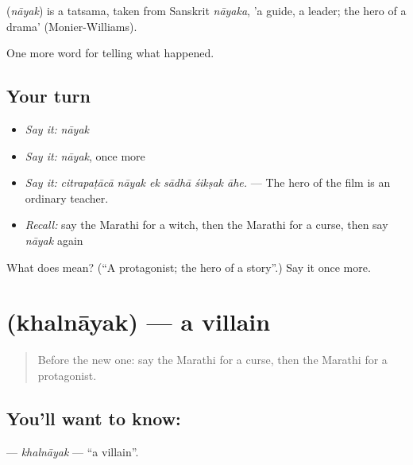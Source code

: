 \begin{cousinweb}
\textbf{} (\emph{nāyak}) is a tatsama, taken from Sanskrit \emph{nāyaka}, 'a guide, a leader; the hero of a drama' (Monier-Williams).
\end{cousinweb}

\begin{grammarlens}[title={What you've built}]
One more word for telling what happened.
\end{grammarlens}

\subsection*{Your turn}
\begin{itemize}
\raggedright
  \item \emph{Say it:} \emph{nāyak}
  \item \emph{Say it:} \emph{nāyak}, once more
  \item \emph{Say it:} \emph{citrapaṭācā nāyak ek sādhā śikṣak āhe.} — The hero of the film is an ordinary teacher.
  \item \emph{Recall:} say the Marathi for a witch, then the Marathi for a curse, then say \emph{nāyak} again
\end{itemize}

\begin{tcolorbox}[breakable,colback=teal!4,colframe=teal!35!black,title={Before you move on}]
What does  mean? (\textquotedblleft{}A protagonist; the hero of a story\textquotedblright{}.) Say it once more.
\end{tcolorbox}
\section[\texorpdfstring{\mr{खलनायक} (khalnāyak)}{खलनायक (khalnāyak)}]{ (khalnāyak) — a villain}

\label{lesson:MR-C339-khalnayak}



\begin{quote}
Before the new one: say the Marathi for a curse, then the Marathi for a protagonist.
\end{quote}

\subsection*{You'll want to know: }
\textbf{} — \emph{khalnāyak} — \textquotedblleft{}a villain\textquotedblright{}.

